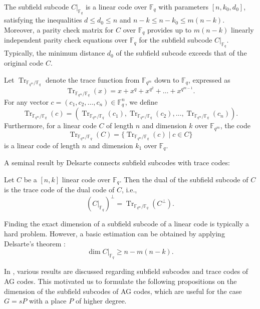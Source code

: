 \documentclass[entropy,article,submit,pdftex,moreauthors]{Definitions/mdpi}
\DeclareMathOperator{\trace}{Tr}
\begin{document}
The subfield subcode $C|_{\mathbb{F}_q}$ is a linear code over $\mathbb{F}_q$ with parameters $[n,k_0,d_0]$, satisfying the inequalities $d \leq d_0 \leq n$ and $n-k \leq n-k_0 \leq m(n-k)$. Moreover, a parity check matrix for $C$ over $\mathbb{F}_q$ provides up to $m(n-k)$ linearly independent parity check equations over $\mathbb{F}_q$ for the subfield subcode $C|_{\mathbb{F}_q}$. Typically, the minimum distance $d_0$ of the subfield subcode exceeds that of the original code $C$.

Let $\trace_{\mathbb{F}_{q^m} / \mathbb{F}_q}$ denote the trace function from $\mathbb{F}_{q^m}$ down to $\mathbb{F}_q$, expressed as
\[
	\trace_{\mathbb{F}_{q^m} / \mathbb{F}_q}(x) = x + x^q + x^{q^2} + \ldots + x^{q^{m-1}}.
\]
For any vector $c = (c_1, c_2, \ldots, c_n) \in \mathbb{F}_q^n$, we define
\[
	\trace_{\mathbb{F}_{q^m} / \mathbb{F}_q}(c) = \left( \trace_{\mathbb{F}_{q^m} / \mathbb{F}_q}(c_1), \trace_{\mathbb{F}_{q^m} / \mathbb{F}_q}(c_2), \ldots, \trace_{\mathbb{F}_{q^m} / \mathbb{F}_q}(c_n) \right).
\]
Furthermore, for a linear code $C$ of length $n$ and dimension $k$ over $\mathbb{F}_{q^m}$, the code 
\[\trace_{\mathbb{F}_{q^m} / \mathbb{F}_q}(C) = \{\trace_{\mathbb{F}_{q^m} / \mathbb{F}_q}(c) \mid  c\in C\}\]
is a linear code of length $n$ and dimension $k_1$ over $\mathbb{F}_q$.

A seminal result by Delsarte connects subfield subcodes with trace codes:

\begin{Theorem}\label{delsarte}
	Let $C$ be a $[n,k]$ linear code over $\mathbb{F}_q$. Then the dual of the subfield subcode of $C$ is the trace code of the dual code of $C$, i.e., 
	\[
		(C|_{\mathbb{F}_q})^{\perp} = \trace_{\mathbb{F}_{q^m} / \mathbb{F}_q}(C^{\perp}).
	\]
\end{Theorem}
Finding the exact dimension of a subfield subcode of a linear code is typically a hard problem. However, a basic estimation can be obtained by applying Delsarte's theorem {\cite{Del75}}:
\begin{equation}
	\dim C|_{\mathbb{F}_q} \geq n - m(n-k).
\end{equation}


In \cite[Chapter~9]{stichtenoth2009algebraic}, various results are discussed regarding subfield subcodes and trace codes of AG codes. This motivated us to formulate the following propositions on the  dimension of the subfield subcodes of AG codes, which are useful for the case $G=sP$ with a place $P$ of higher degree.
\end{document}

